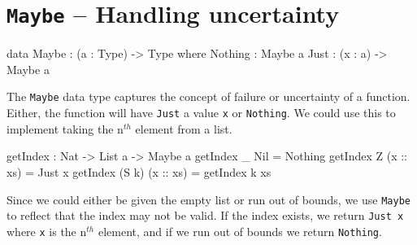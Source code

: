 \section{\texttt{Maybe} -- Handling uncertainty}
    \begin{code}[caption={The \texttt{Maybe} data type}]
        data Maybe : (a : Type) -> Type where
            Nothing : Maybe a
            Just : (x : a) -> Maybe a
    \end{code}

    The \texttt{Maybe} data type captures the concept of failure or uncertainty of a function. Either, the function will have \texttt{Just} a value \texttt{x} or \texttt{Nothing}. We could use this to implement taking the n$^{th}$ element from a list.
    \begin{code}[caption={List indexing using \texttt{Maybe}}]
        getIndex : Nat -> List a -> Maybe a
        getIndex _ Nil = Nothing
        getIndex Z (x :: xs) = Just x
        getIndex (S k) (x :: xs) = getIndex k xs
    \end{code}
    Since we could either be given the empty list or run out of bounds, we use \texttt{Maybe} to reflect that the index may not be valid. If the index exists, we return \texttt{Just x} where \texttt{x} is the n$^{th}$ element, and if we run out of bounds we return \texttt{Nothing}.

